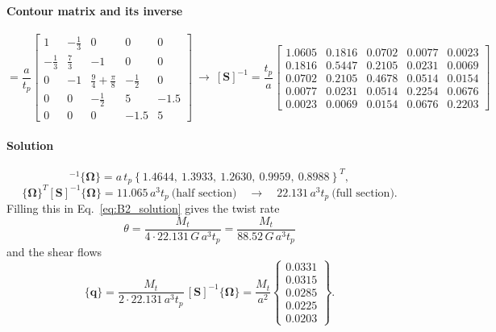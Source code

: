 \paragraph{Contour matrix and its inverse}
\begin{equation}
[\mathbf{S}] = \frac{a}{t_p}
\begin{bmatrix}
 1          & -\tfrac13 & 0                          & 0          & 0    \\
 -\tfrac13  & \tfrac73  & -1                         & 0          & 0    \\
 0          & -1        & \tfrac94+\tfrac{\pi}{8}    & -\tfrac12  & 0    \\
 0          & 0         & -\tfrac12                  & 5          & -1.5 \\
 0          & 0         & 0                          & -1.5       & 5
\end{bmatrix}
\ \rightarrow\
[\mathbf{S}]^{-1} = \frac{t_p}{a}
\begin{bmatrix}
 1.0605 & 0.1816 & 0.0702 & 0.0077 & 0.0023 \\
 0.1816 & 0.5447 & 0.2105 & 0.0231 & 0.0069 \\
 0.0702 & 0.2105 & 0.4678 & 0.0514 & 0.0154 \\
 0.0077 & 0.0231 & 0.0514 & 0.2254 & 0.0676 \\
 0.0023 & 0.0069 & 0.0154 & 0.0676 & 0.2203
\end{bmatrix}
\label{eq:B2_S}
\end{equation}

\paragraph{Solution}
\begin{equation*}
  [\mathbf{S}]^{-1}\{\boldsymbol{\Omega}\}
  = a\,t_p\left\{1.4644,\ 1.3933,\ 1.2630,\ 0.9959,\ 0.8988\right\}^T,
\end{equation*}
\begin{equation*}
  \{\boldsymbol{\Omega}\}^T[\mathbf{S}]^{-1}\{\boldsymbol{\Omega}\}
  = 11.065\,a^3t_p \ \text{(half section)}
  \quad\rightarrow\quad
  22.131\,a^3t_p \ \text{(full section)} .
\end{equation*}
Filling this in Eq.~\eqref{eq:B2_solution} gives the twist rate
\begin{equation*}
  \theta = \frac{M_t}{4\cdot22.131\,G\,a^3t_p} = \frac{M_t}{88.52\,G\,a^3t_p}
\end{equation*}
and the shear flows
\begin{equation}
  \{\mathbf{q}\} = \frac{M_t}{2\cdot22.131\,a^3t_p}\,[\mathbf{S}]^{-1}\{\boldsymbol{\Omega}\}
  = \frac{M_t}{a^2}
  \begin{Bmatrix} 0.0331\\ 0.0315\\ 0.0285\\ 0.0225\\ 0.0203 \end{Bmatrix} .
  \label{eq:B2_q}
\end{equation}

